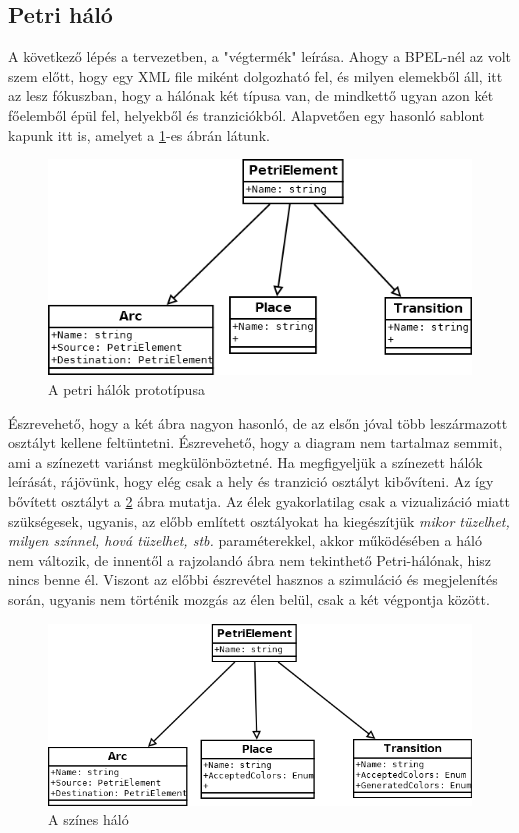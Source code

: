 \subsection{Petri háló}
A következő lépés a tervezetben, a "végtermék" leírása. Ahogy a BPEL-nél az volt szem előtt, hogy egy XML file miként dolgozható fel, és milyen elemekből áll, itt az lesz fókuszban, hogy a hálónak két típusa van, de mindkettő ugyan azon két főelemből épül fel, helyekből és tranziciókból. Alapvetően egy hasonló sablont kapunk itt is, amelyet a \ref{fig:petriclass}-es ábrán látunk.
\begin{figure}[h!]
\centering
\includegraphics[scale=0.5]{images/petriClass.png}
\caption{A petri hálók prototípusa}
\label{fig:petriclass}
\end{figure}

Észrevehető, hogy a két ábra nagyon hasonló, de az elsőn jóval több leszármazott osztályt kellene feltüntetni. Észrevehető, hogy a diagram nem tartalmaz semmit, ami a színezett variánst megkülönböztetné. Ha megfigyeljük a színezett hálók leírását, rájövünk, hogy elég csak a hely és tranzició osztályt kibővíteni. Az így bővített osztályt a \ref{fig:colornet} ábra mutatja. Az élek gyakorlatilag csak a vizualizáció miatt szükségesek, ugyanis, az előbb említett osztályokat ha kiegészítjük \emph{mikor tüzelhet, milyen színnel, hová tüzelhet, stb. } paraméterekkel, akkor működésében a háló nem változik, de innentől a rajzolandó ábra nem tekinthető Petri-hálónak, hisz nincs benne él. Viszont az előbbi észrevétel hasznos a szimuláció és megjelenítés során, ugyanis nem történik mozgás az élen belül, csak a két végpontja között. 

\begin{figure}[h!]
\centering
\includegraphics[scale=0.5]{images/PentC.png}
\caption{A színes háló}
\label{fig:colornet}
\end{figure}

